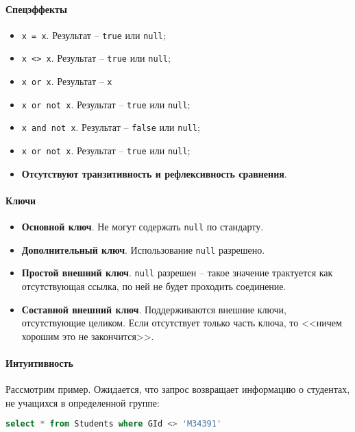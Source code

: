 \paragraph{Спецэффекты}

\begin{itemize}
	\item \texttt{x = x}. Результат -- \texttt{true} или \texttt{null};
	\item \texttt{x <> x}. Результат -- \texttt{true} или \texttt{null};
	\item \texttt{x or x}. Результат -- \texttt{x}
	\item \texttt{x or not x}. Результат -- \texttt{true} или \texttt{null};
	\item \texttt{x and not x}. Результат -- \texttt{false} или \texttt{null};
	\item \texttt{x or not x}. Результат -- \texttt{true} или \texttt{null};
	\item \textbf{Отсутствуют транзитивность и рефлексивность сравнения}.
\end{itemize}

\paragraph{Ключи}

\begin{itemize}
	\item \textbf{Основной ключ}. Не могут содержать \texttt{null} по стандарту.
	\item \textbf{Дополнительный ключ}. Использование \texttt{null} разрешено.
	\item \textbf{Простой внешний ключ}. \texttt{null} разрешен -- такое значение трактуется
	      как отсутствующая ссылка, по ней не будет проходить соединение.
	\item \textbf{Составной внешний ключ}. Поддерживаются внешние ключи, отсутствующие целиком.
	      Если отсутствует только часть ключа, то <<ничем хорошим это не закончится>>.
\end{itemize}

\paragraph{Интуитивность}

Рассмотрим пример. Ожидается, что запрос возвращает информацию о студентах, не учащихся в
определенной группе:

\begin{lstlisting}[language=SQL]
    select * from Students where GId <> 'M34391'
\end{lstlisting}

